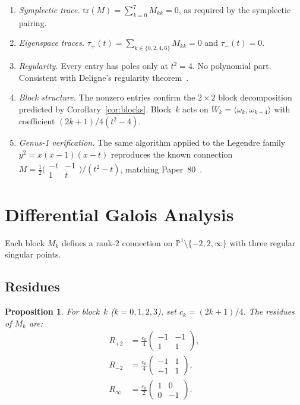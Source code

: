 \documentclass[11pt]{article}
\theoremstyle{plain}
\newtheorem{proposition}[theorem]{Proposition}
\theoremstyle{definition}
\theoremstyle{remark}
\newcommand{\tr}{\mathrm{tr}}
\begin{document}
\begin{enumerate}[nosep]
\item \emph{Symplectic trace.} $\tr(M) = \sum_{k=0}^{7} M_{kk} = 0$,
  as required by the symplectic pairing.
\item \emph{Eigenspace traces.} $\tau_+(t) = \sum_{k \in \{0,2,4,6\}}
  M_{kk} = 0$ and $\tau_-(t) = 0$.
\item \emph{Regularity.} Every entry has poles only at $t^2 = 4$.
  No polynomial part. Consistent with Deligne's regularity
  theorem~\cite{Deligne1971}.
\item \emph{Block structure.} The nonzero entries confirm the
  $2 \times 2$ block decomposition predicted by
  Corollary~\ref{cor:blocks}. Block~$k$ acts on
  $W_k = \langle\omega_k, \omega_{k+4}\rangle$ with coefficient
  $(2k+1)/4(t^2-4)$.
\item \emph{Genus-1 verification.} The same algorithm applied to the
  Legendre family $y^2 = x(x-1)(x-t)$ reproduces the known
  connection $M = \tfrac{1}{2}\bigl(\begin{smallmatrix} -t & -1 \\
  1 & t \end{smallmatrix}\bigr) / (t^2-t)$, matching
  Paper~80~\cite{Lee2026p80}.
\end{enumerate}

\section{Differential Galois Analysis}\label{sec:galois}

Each block $M_k$ defines a rank-2 connection on $\mathbb{P}^1 \setminus
\{-2, 2, \infty\}$ with three regular singular points.

\subsection{Residues}

\begin{proposition}\label{prop:residues}
For block~$k$ ($k = 0,1,2,3$), set $c_k = (2k+1)/4$. The residues
of $M_k$ are:
\begin{align}
  R_{+2} &= \frac{c_k}{4}
  \begin{pmatrix} -1 & -1 \\ 1 & 1 \end{pmatrix}, \label{eq:Rp}\\
  R_{-2} &= \frac{c_k}{4}
  \begin{pmatrix} -1 & 1 \\ -1 & 1 \end{pmatrix}, \label{eq:Rm}\\
  R_\infty &= \frac{c_k}{2}
  \begin{pmatrix} 1 & 0 \\ 0 & -1 \end{pmatrix}. \label{eq:Ri}
\end{align}
\end{proposition}
\end{document}
